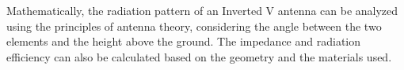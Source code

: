 Mathematically, the radiation pattern of an Inverted V antenna can be analyzed using the principles of antenna theory, considering the angle between the two elements and the height above the ground. The impedance and radiation efficiency can also be calculated based on the geometry and the materials used.

